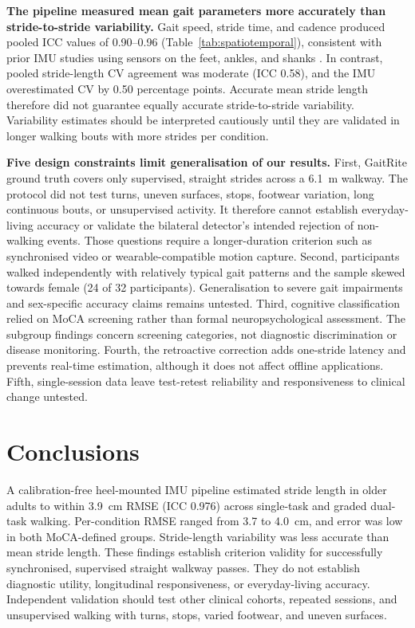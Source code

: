 \documentclass[fleqn,10pt,lineno]{wlpeerj}
\begin{document}
\textbf{The pipeline measured mean gait parameters more accurately than stride-to-stride variability.} Gait speed, stride time, and cadence produced pooled ICC values of 0.90--0.96 (Table~\ref{tab:spatiotemporal}), consistent with prior IMU studies using sensors on the feet, ankles, and shanks \citep{Trojaniello2014, Washabaugh2017}. In contrast, pooled stride-length CV agreement was moderate (ICC 0.58), and the IMU overestimated CV by 0.50 percentage points. Accurate mean stride length therefore did not guarantee equally accurate stride-to-stride variability. Variability estimates should be interpreted cautiously until they are validated in longer walking bouts with more strides per condition.

\textbf{Five design constraints limit generalisation of our results.} First, GaitRite ground truth covers only supervised, straight strides across a 6.1~m walkway. The protocol did not test turns, uneven surfaces, stops, footwear variation, long continuous bouts, or unsupervised activity. It therefore cannot establish everyday-living accuracy or validate the bilateral detector's intended rejection of non-walking events. Those questions require a longer-duration criterion such as synchronised video or wearable-compatible motion capture. Second, participants walked independently with relatively typical gait patterns and the sample skewed towards female (24 of 32 participants). Generalisation to severe gait impairments and sex-specific accuracy claims remains untested. Third, cognitive classification relied on MoCA screening rather than formal neuropsychological assessment. The subgroup findings concern screening categories, not diagnostic discrimination or disease monitoring. Fourth, the retroactive correction adds one-stride latency and prevents real-time estimation, although it does not affect offline applications. Fifth, single-session data leave test-retest reliability and responsiveness to clinical change untested.


\clearpage
\section{Conclusions}

A calibration-free heel-mounted IMU pipeline estimated stride length in older adults to within 3.9~cm RMSE (ICC 0.976) across single-task and graded dual-task walking. Per-condition RMSE ranged from 3.7 to 4.0~cm, and error was low in both MoCA-defined groups. Stride-length variability was less accurate than mean stride length. These findings establish criterion validity for successfully synchronised, supervised straight walkway passes. They do not establish diagnostic utility, longitudinal responsiveness, or everyday-living accuracy. Independent validation should test other clinical cohorts, repeated sessions, and unsupervised walking with turns, stops, varied footwear, and uneven surfaces.
\end{document}
